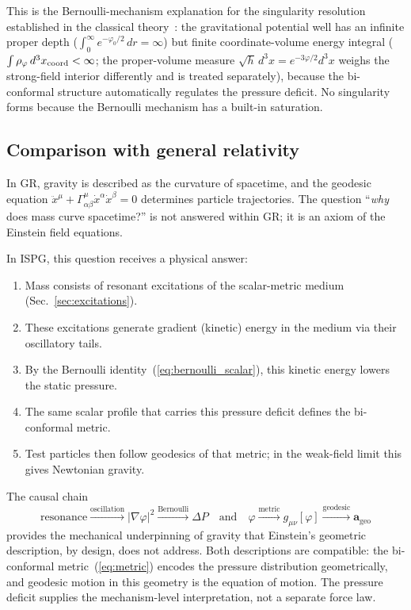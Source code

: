\documentclass[aps,prd,onecolumn,superscriptaddress,nofootinbib,showpacs,12pt,notitlepage]{revtex4-2}
\begin{document}
This is the Bernoulli-mechanism explanation for the
singularity resolution established in the classical
theory~\cite{Lotishvili2026}: the gravitational potential
well has an infinite proper depth
($\int_0^\infty e^{-\varphi_0/2}\,dr = \infty$) but
finite coordinate-volume energy integral
($\int \rho_\varphi\,d^3x_{\rm coord} < \infty$; the
proper-volume measure $\sqrt{h}\,d^3x = e^{-3\varphi/2}d^3x$
weighs the strong-field interior differently and is treated
separately),
because the bi-conformal structure automatically regulates
the pressure deficit.  No singularity forms because the
Bernoulli mechanism has a built-in saturation.

\subsection{Comparison with general relativity}
\label{sec:gr_comparison}

In GR, gravity is described as the curvature of spacetime,
and the geodesic equation $\ddot{x}^\mu + \Gamma^\mu_{\alpha\beta}
\dot{x}^\alpha\dot{x}^\beta = 0$ determines particle
trajectories.  The question ``\emph{why} does mass curve
spacetime?'' is not answered within GR; it is an axiom
of the Einstein field equations.

In ISPG, this question receives a physical answer:
\begin{enumerate}
  \item Mass consists of resonant excitations of the
    scalar-metric medium (Sec.~\ref{sec:excitations}).
  \item These excitations generate gradient (kinetic)
    energy in the medium via their oscillatory tails.
  \item By the Bernoulli identity~(\ref{eq:bernoulli_scalar}),
    this kinetic energy lowers the static pressure.
  \item The same scalar profile that carries this pressure
    deficit defines the bi-conformal metric.
  \item Test particles then follow geodesics of that metric;
    in the weak-field limit this gives Newtonian gravity.
\end{enumerate}

The causal chain
\begin{equation}\label{eq:chain}
  \text{resonance} \xrightarrow{\text{oscillation}}
  |\nabla\varphi|^{2} \xrightarrow{\text{Bernoulli}}
  \Delta P
  \quad\text{and}\quad
  \varphi \xrightarrow{\text{metric}}
  g_{\mu\nu}[\varphi]\xrightarrow{\text{geodesic}}
  \mathbf{a}_{\mathrm{geo}}
\end{equation}
provides the mechanical underpinning of gravity that
Einstein's geometric description, by design, does not
address.  Both descriptions are compatible: the
bi-conformal metric~(\ref{eq:metric}) encodes the
pressure distribution geometrically, and geodesic motion
in this geometry is the equation of motion.  The pressure
deficit supplies the mechanism-level interpretation, not a
separate force law.
\end{document}
